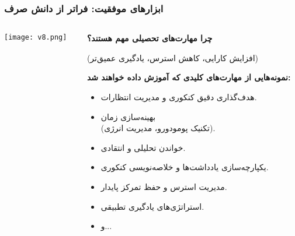 \documentclass[aspectratio=169]{beamer}
\begin{document}
\begin{frame}[fragile]
  \frametitle{ابزارهای موفقیت: فراتر از دانش صرف}

  \begin{columns}[T]
    \begin{column}{0.4\textwidth}
      \texttt{[image: v8.png]}
    \end{column}

    \begin{column}{0.55\textwidth}
      \begin{flushright}
        \textbf{چرا مهارت‌های تحصیلی مهم هستند؟}
      \end{flushright}
      (افزایش کارایی، کاهش استرس، یادگیری عمیق‌تر)
      \medskip

      \begin{flushright}
        \textbf{نمونه‌هایی از مهارت‌های کلیدی که آموزش داده خواهند شد:}
      \end{flushright}
      \begin{itemize}\setlength{\itemsep}{5pt}\setlength{\parsep}{3pt}
        \item هدف‌گذاری دقیق کنکوری و مدیریت انتظارات.
        \item بهینه‌سازی زمان\\(تکنیک پومودورو، مدیریت انرژی).
        \item خواندن تحلیلی و انتقادی.
        \item یکپارچه‌سازی یادداشت‌ها و خلاصه‌نویسی کنکوری.
        \item مدیریت استرس و حفظ تمرکز پایدار.
        \item استراتژی‌های یادگیری تطبیقی.
        \item و...
      \end{itemize}
    \end{column}
  \end{columns}
\end{frame}
\end{document}
